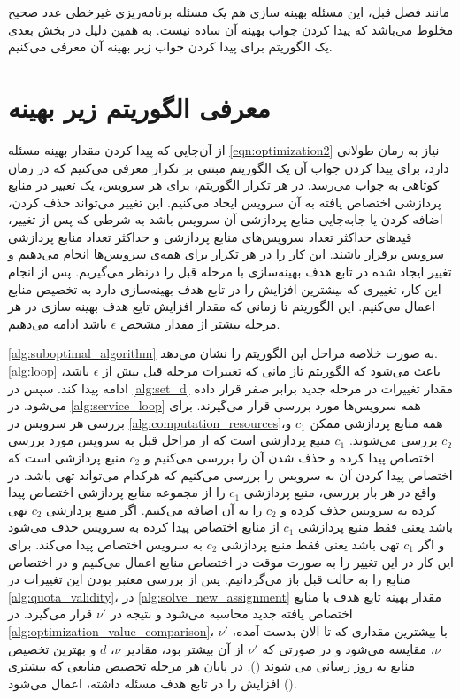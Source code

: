     مانند فصل قبل، این مسئله بهینه سازی هم یک مسئله برنامه‌ریزی غیرخطی عدد صحیح مخلوط می‌باشد که پیدا کردن جواب بهینه آن ساده نیست.
    به همین دلیل در بخش بعدی یک الگوریتم برای پیدا کردن جواب زیر بهینه آن معرفی می‌کنیم.

  \section{معرفی الگوریتم زیر بهینه}
    از آن‌جایی که پیدا کردن مقدار بهینه مسئله \eqref{eqn:optimization2} نیاز به زمان طولانی دارد، برای پیدا کردن جواب آن یک الگوریتم مبتنی بر تکرار معرفی می‌کنیم که در زمان کوتاهی به جواب می‌رسد.
    در هر تکرار الگوریتم، برای هر سرویس، یک تغییر در منابع پردازشی اختصاص یافته به آن سرویس ایجاد می‌کنیم.
    این تغییر می‌تواند حذف کردن، اضافه کردن یا جابه‌جایی منابع پردازشی آن سرویس باشد به شرطی که پس از تغییر، قید‌های حداکثر تعداد سرویس‌های منابع پردازشی و حداکثر تعداد منابع پردازشی سرویس برقرار باشند.
    این کار را در هر تکرار برای همه‌ی سرویس‌ها انجام می‌دهیم و تغییر ایجاد شده در تابع هدف بهینه‌سازی با مرحله قبل را درنظر می‌گیریم.
    پس از انجام این کار، تغییری که بیشترین افزایش را در تابع هدف بهینه‌سازی دارد به تخصیص منابع اعمال می‌کنیم.
    این الگوریتم تا زمانی که مقدار افزایش تابع هدف بهینه سازی در هر مرحله بیشتر از مقدار مشخص $\epsilon$ باشد ادامه می‌دهیم.

    \cref{alg:suboptimal_algorithm} به صورت خلاصه مراحل این الگوریتم را نشان می‌دهد.
    \cref{alg:loop} باعث می‌شود که الگوریتم تاز مانی که تغییرات مرحله قبل بیش از $\epsilon$ باشد، ادامه پیدا کند.
    سپس در \cref{alg:set_d} مقدار تغییرات در مرحله جدید برابر صفر قرار داده می‌شود.
    در \cref{alg:service_loop} همه سرویس‌ها مورد بررسی قرار می‌گیرند.
    برای بررسی هر سرویس در \cref{alg:computation_resources}،همه منابع پردازشی ممکن $c_1$ و $c_2$ بررسی می‌شوند.
    $c_1$ منبع پردازشی است که از مراحل قبل به سرویس مورد بررسی اختصاص پیدا کرده و حذف شدن آن را بررسی می‌کنیم و $c_2$ منبع پردازشی است که اختصاص پیدا کردن آن به سرویس را بررسی می‌کنیم که هرکدام می‌تواند تهی باشد.
    در واقع در هر بار بررسی، منبع پردازشی $c_1$ را از مجموعه منابع پردازشی اختصاص پیدا کرده به سرویس حذف کرده و $c_2$ را به آن اضافه می‌کنیم.
    اگر منبع پردازشی $c_2$ تهی باشد یعنی فقط منبع پردازشی $c_1$ از منابع اختصاص پیدا کرده به سرویس حذف می‌شود و اگر $c_1$ تهی باشد یعنی فقط منبع پردازشی $c_2$ به سرویس اختصاص پیدا می‌کند.
    برای این کار در  این تغییر را به صورت موقت در اختصاص منابع اعمال می‌کنیم و در  اختصاص منابع را به حالت قبل باز می‌گردانیم.
    پس از بررسی معتبر بودن این تغییرات در \cref{alg:quota_validity}، در \cref{alg:solve_new_assignment} مقدار بهینه تابع هدف با منابع اختصاص یافته جدید محاسبه می‌شود و نتیجه در $\nu'$ قرار می‌گیرد.
    در \cref{alg:optimization_value_comparison}، $\nu'$ با بیشترین مقداری که تا الان بدست آمده، $\nu$، مقایسه می‌شود و در صورتی که $\nu'$ از آن بیشتر بود، مقادیر $\nu$، $d$ و بهترین تخصیص منابع به روز رسانی می شوند ().
    در پایان هر مرحله تخصیص منابعی که بیشتری افزایش را در تابع هدف مسئله داشته، اعمال می‌شود ().

